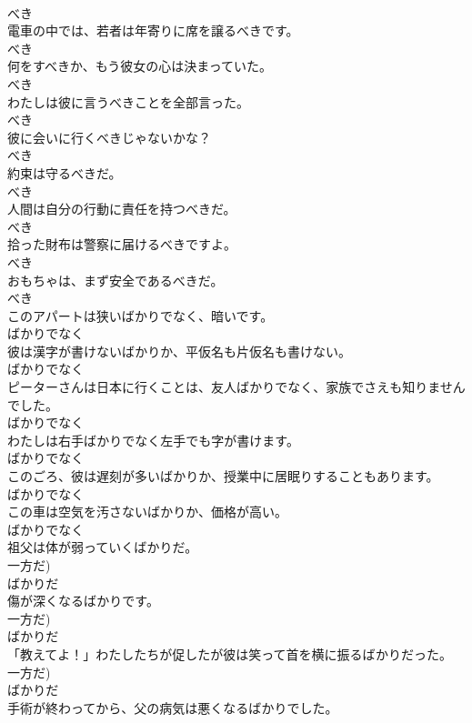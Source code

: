 \documentclass[8pt]{extreport}
\begin{document}
\begin{CJK}{UTF8}{min}
\\	べき
\\	電車の中では、若者は年寄りに席を譲るべきです。	
\\	べき
\\	何をすべきか、もう彼女の心は決まっていた。	
\\	べき
\\	わたしは彼に言うべきことを全部言った。	
\\	べき
\\	彼に会いに行くべきじゃないかな？	
\\	べき
\\	約束は守るべきだ。	
\\	べき
\\	人間は自分の行動に責任を持つべきだ。	
\\	べき
\\	拾った財布は警察に届けるべきですよ。	
\\	べき
\\	おもちゃは、まず安全であるべきだ。	
\\	べき
\\	このアパートは狭いばかりでなく、暗いです。	
\\	ばかりでなく
\\	彼は漢字が書けないばかりか、平仮名も片仮名も書けない。	
\\	ばかりでなく
\\	ピーターさんは日本に行くことは、友人ばかりでなく、家族でさえも知りませんでした。	
\\	ばかりでなく
\\	わたしは右手ばかりでなく左手でも字が書けます。	
\\	ばかりでなく
\\	このごろ、彼は遅刻が多いばかりか、授業中に居眠りすることもあります。	
\\	ばかりでなく
\\	この車は空気を汚さないばかりか、価格が高い。	
\\	ばかりでなく
\\	祖父は体が弱っていくばかりだ。	
\\	一方だ)	
\\	ばかりだ
\\	傷が深くなるばかりです。	
\\	一方だ)	
\\	ばかりだ
\\	「教えてよ！」わたしたちが促したが彼は笑って首を横に振るばかりだった。	
\\	一方だ)	
\\	ばかりだ
\\	手術が終わってから、父の病気は悪くなるばかりでした。	

\end{CJK}
\end{document}
